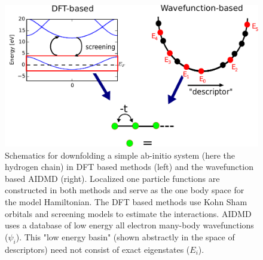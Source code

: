 \begin{figure}[htpb]
\centering
\includegraphics[width=1\linewidth]{./Figures/figure1.pdf}
\caption{Schematics for downfolding a simple ab-initio system (here the hydrogen chain) 
in DFT based methods (left) and the wavefunction based AIDMD (right). Localized one particle functions 
are constructed in both methods and serve as the one body space for the model Hamiltonian. The DFT based methods 
use Kohn Sham orbitals and screening models to estimate the interactions. AIDMD uses a database of low energy 
all electron many-body wavefunctions ($\psi_i$). This "low energy basin" 
(shown abstractly in the space of descriptors) need not consist of exact eigenstates ($E_i$).}
\label{fig:lowenergybasin_schematic}
\end{figure}	



